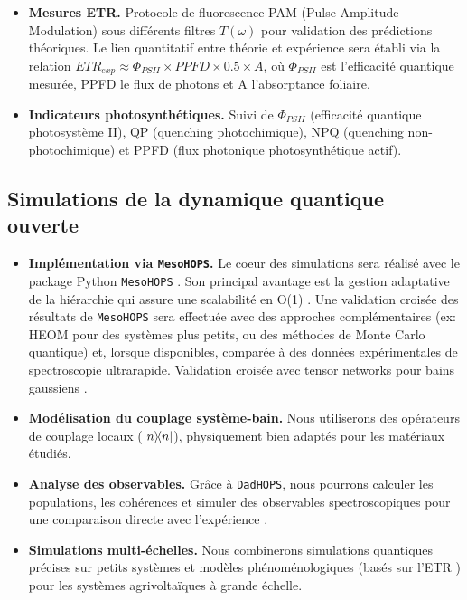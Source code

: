 \documentclass[12pt, a4paper]{article}
\begin{document}
\begin{enumerate}
\begin{itemize}
        \item \textbf{Mesures ETR.} Protocole de fluorescence PAM (Pulse Amplitude Modulation) sous différents filtres $T(\omega)$ pour validation des prédictions théoriques. Le lien quantitatif entre théorie et expérience sera établi via la relation $ETR_{exp} \approx \Phi_{PSII} \times PPFD \times 0.5 \times A$, où $\Phi_{PSII}$ est l'efficacité quantique mesurée, PPFD le flux de photons et A l'absorptance foliaire.
        
        \item \textbf{Indicateurs photosynthétiques.} Suivi de $\Phi_{PSII}$ (efficacité quantique photosystème II), QP (quenching photochimique), NPQ (quenching non-photochimique) et PPFD (flux photonique photosynthétique actif).
\end{itemize}
\end{enumerate}

\subsection{Simulations de la dynamique quantique ouverte}

\begin{itemize}
    \item \textbf{Implémentation via \texttt{MesoHOPS}.} Le coeur des simulations sera réalisé avec le package Python \texttt{MesoHOPS} \cite{Citty2024}. Son principal avantage est la gestion adaptative de la hiérarchie qui assure une scalabilité en O(1) \cite{varvelo2021}. Une validation croisée des résultats de \texttt{MesoHOPS} sera effectuée avec des approches complémentaires (ex: HEOM pour des systèmes plus petits, ou des méthodes de Monte Carlo quantique) et, lorsque disponibles, comparée à des données expérimentales de spectroscopie ultrarapide. Validation croisée avec tensor networks pour bains gaussiens \cite{Link2024}.

    \item \textbf{Modélisation du couplage système-bain.} Nous utiliserons des opérateurs de couplage locaux ($\op{n}$), physiquement bien adaptés pour les matériaux étudiés.

    \item \textbf{Analyse des observables.} Grâce à \texttt{DadHOPS}, nous pourrons calculer les populations, les cohérences et simuler des observables spectroscopiques pour une comparaison directe avec l'expérience \cite{Gera2023, Chen2022a}.

    \item \textbf{Simulations multi-échelles.} Nous combinerons simulations quantiques précises sur petits systèmes et modèles phénoménologiques (basés sur l'ETR \cite{ye2012}) pour les systèmes agrivoltaïques à grande échelle.
\end{itemize}
\end{document}
